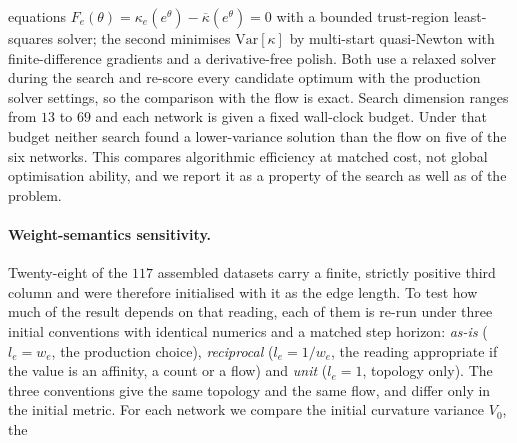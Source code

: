 \documentclass[11pt]{article}
\newcommand{\Var}{\mathrm{Var}}
\begin{document}
equations $F_e(\theta) = \kappa_e(e^\theta) - \overline{\kappa}(e^\theta) = 0$
with a bounded trust-region least-squares solver; the second minimises
$\Var[\kappa]$ by multi-start quasi-Newton with finite-difference gradients and
a derivative-free polish. Both use a relaxed solver during the search and
re-score every candidate optimum with the production solver settings, so the
comparison with the flow is exact. Search dimension ranges from $13$ to $69$
and each network is given a fixed wall-clock budget. Under that budget neither
search found a lower-variance solution than the flow on five of the six
networks. This compares algorithmic efficiency at matched cost, not global
optimisation ability, and we report it as a property of the search as well as of
the problem.

\paragraph{Weight-semantics sensitivity.} Twenty-eight of the $117$
assembled datasets carry a finite, strictly positive third column and were
therefore initialised with it as the edge length. To test how much of the
result depends on that reading, each of them is re-run under three initial
conventions with identical numerics and a matched step horizon:
\emph{as-is} ($l_e = w_e$, the production choice), \emph{reciprocal}
($l_e = 1/w_e$, the reading appropriate if the value is an affinity, a count
or a flow) and \emph{unit} ($l_e = 1$, topology only). The three conventions
give the same topology and the same flow, and differ only in the initial
metric. For each network we compare the initial curvature variance $V_0$, the
\end{document}
